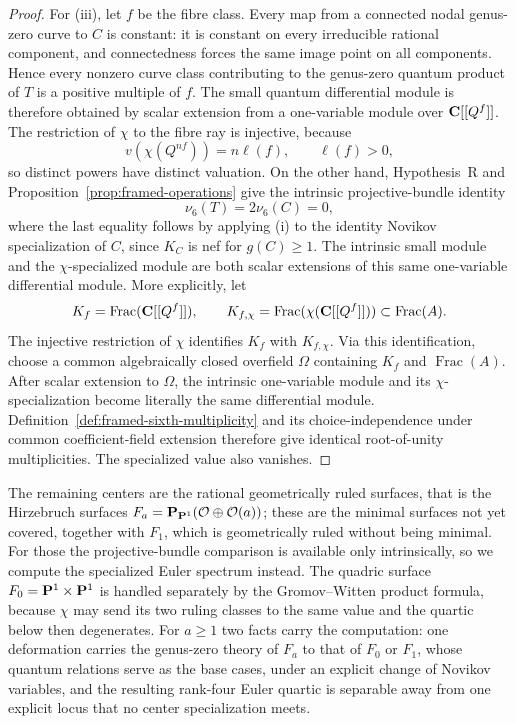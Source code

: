 \begin{proof}
For (iii), let \(f\) be the fibre class.  Every map from a connected
nodal genus-zero curve to \(C\) is constant: it is constant on every
irreducible rational component, and connectedness forces the same image
point on all components.  Hence every nonzero curve class contributing to
the genus-zero quantum product of \(T\) is a positive multiple of \(f\).
The small quantum differential module is therefore obtained by scalar
extension from a one-variable module over \(\mathbf C[[Q^f]]\).  The restriction
of \(\chi\) to the fibre ray is injective, because
\[
 v(\chi(Q^{nf}))=n\ell(f),
 \qquad \ell(f)>0,
\]
so distinct powers have distinct valuation.  On the other hand,
Hypothesis~R and Proposition~\ref{prop:framed-operations} give the
intrinsic projective-bundle identity
\[
 \nu_6(T)=2\nu_6(C)=0,
\]
where the last equality follows by applying (i) to the identity Novikov
specialization of \(C\), since \(K_C\) is nef for \(g(C)\ge1\).
The intrinsic small module and the \(\chi\)-specialized module are both
scalar extensions of this same one-variable differential module.  More
explicitly, let
\[
 K_f=\operatorname{Frac}(\mathbf C[[Q^f]]),
 \qquad
 K_{f,\chi}=\operatorname{Frac}(\chi(\mathbf C[[Q^f]]))
 \subset\operatorname{Frac}(A).
\]
The injective restriction of \(\chi\) identifies \(K_f\) with
\(K_{f,\chi}\).  Via this identification, choose a common algebraically
closed overfield \(\Omega\) containing \(K_f\) and
\(\operatorname{Frac}(A)\).  After scalar extension to \(\Omega\), the
intrinsic one-variable module and its \(\chi\)-specialization become
literally the same differential module.  Definition~\ref{def:framed-sixth-multiplicity} and
its choice-independence under common coefficient-field extension therefore
give identical root-of-unity multiplicities.  The specialized value also
vanishes.
\end{proof}

The remaining centers are the rational geometrically ruled surfaces, that is the
Hirzebruch surfaces \(F_a=\mathbf P_{\mathbf P^1}(\mathcal O\oplus\mathcal O(a))\); these are the minimal
surfaces not yet covered, together with \(F_1\), which is geometrically ruled
without being minimal.  For those the projective-bundle
comparison is available only intrinsically, so we compute the specialized Euler
spectrum instead.  The quadric surface \(F_0=\mathbf P^1\times\mathbf P^1\) is handled
separately by the Gromov--Witten product formula, because \(\chi\) may send its
two ruling classes to the same value and the quartic below then degenerates.  For
\(a\ge1\) two facts carry the computation: one deformation carries the
genus-zero theory of \(F_a\) to that of \(F_0\) or \(F_1\), whose quantum
relations serve as the base cases, under an explicit change of Novikov
variables, and the resulting rank-four Euler quartic is
separable away from one explicit locus that no center specialization meets.

